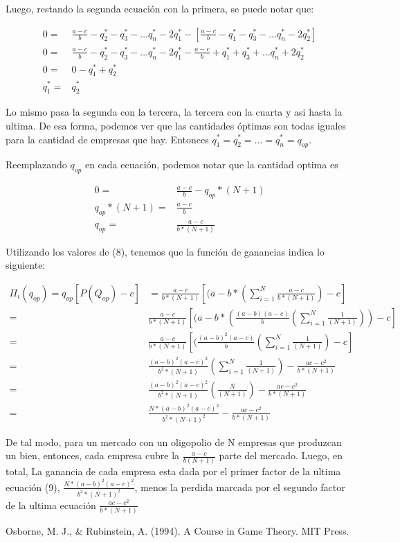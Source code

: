 \documentclass{homework}
\begin{document}
Luego, restando la segunda ecuación con la primera, se puede notar que:

\begin{equation}
\begin{split}
    0 =& \frac{a-c}{b} - q_2^* - q_3^* - \dots q_n^* - 2q_1^* - [\frac{a-c}{b} - q_1^*- q_3^* - \dots q_n^* - 2q_2^*] \\
    0 =& \frac{a-c}{b} - q_2^* - q_3^* - \dots q_n^* - 2q_1^* - \frac{a-c}{b} + q_1^*+ q_3^* + \dots q_n^* + 2q_2^* \\
    0 =& 0 -q_1^* + q_2^* \\
    q_1^* =& q_2^*
\end{split}
\end{equation}

Lo mismo pasa la segunda con la tercera, la tercera con la cuarta y asi hasta la ultima. De esa forma, podemos ver que las cantidades óptimas son todas iguales para la cantidad de empresas que hay. Entonces $q_1^* = q_2^* = \dots = q_n^* = q_{op} $.

Reemplazando $q_{op}$ en cada ecuación, podemos notar que la cantidad optima es 

\begin{equation}
\begin{split}
     0 =& \frac{a-c}{b} - q_{op}*(N+1) \\ 
     q_{op}*(N+1) =& \frac{a-c}{b} \\
     q_{op} =& \frac{a-c}{b*(N+1)}
\end{split}
\end{equation}

Utilizando los valores de (8), tenemos que la función de ganancias indica lo siguiente:

\begin{equation}
\begin{split}
    \Pi_i(q_{op}) =q_{op}[P(Q_{op} )-c] &= \frac{a-c}{b*(N+1)}[(a-b*(\sum_{i=1}^{N}\frac{a-c}{b*(N+1)} ) - c] \\
    =& \frac{a-c}{b*(N+1)}[(a-b*( \frac{(a-b)(a-c)}{b}(\sum_{i=1}^{N}\frac{1}{(N+1)} )) - c] \\
    =& \frac{a-c}{b*(N+1)}[( \frac{(a-b)^2(a-c)}{b}(\sum_{i=1}^{N}\frac{1}{(N+1)} ) - c] \\
    =& \frac{(a-b)^2(a-c)^2}{b^2*(N+1)}(\sum_{i=1}^{N}\frac{1}{(N+1)} ) - \frac{ac-c^2}{b*(N+1)} \\
    =& \frac{(a-b)^2(a-c)^2}{b^2*(N+1)}(\frac{N}{(N+1)} ) - \frac{ac-c^2}{b*(N+1)} \\
    =& \frac{N*(a-b)^2(a-c)^2}{b^2*(N+1)^2}- \frac{ac-c^2}{b*(N+1)}
\end{split}
\end{equation}


De tal modo, para un mercado con un oligopolio de N empresas que produzcan un bien, entonces, cada empresa cubre la $\frac{a-c}{b(N+1)}$ parte del mercado. Luego, en total, La ganancia de cada empresa esta dada por el primer factor de la ultima ecuación (9), $\frac{N*(a-b)^2(a-c)^2}{b^2*(N+1)^2}$, menos la perdida marcada por el segundo factor de la ultima ecuación $\frac{ac-c^2}{b*(N+1)}$



Osborne, M. J., \& Rubinstein, A. (1994). A Course in Game Theory. MIT Press.
\end{document}
